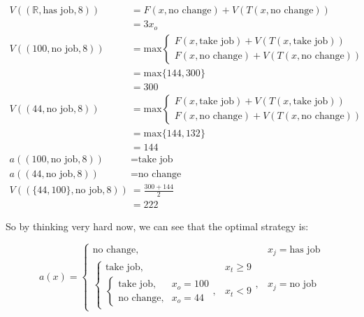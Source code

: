 \documentclass[a4paper, 12pt]{article}
\begin{document}
\[
\begin{aligned}
  V((\mathbb{R}, \text{has job}, 8)) &= F(x, \text{no change}) + V(T(x, \text{no change})) \\
                                &= 3x_{o} \\
  V((100, \text{no job}, 8)) &= \text{max} \begin{cases}
    F(x, \text{take job}) + V(T(x, \text{take job})) \\
    F(x, \text{no change}) + V(T(x, \text{no change}))
  \end{cases} \\
                             &= \text{max}\{144, 300\} \\
                             &= 300 \\
  V((44, \text{no job}, 8)) &= \text{max} \begin{cases}
    F(x, \text{take job}) + V(T(x, \text{take job})) \\
    F(x, \text{no change}) + V(T(x, \text{no change}))
  \end{cases} \\
                             &= \text{max}\{144, 132\} \\
                             &= 144 \\
    a((100, \text{no job}, 8)) &= \text{take job} \\
    a((44, \text{no job}, 8)) &= \text{no change} \\
    V((\{44, 100\}, \text{no job}, 8)) &= \frac{300+144}{2} \\
                                       &= 222
\end{aligned}
\]

So by thinking very hard now, we can see that the optimal strategy is:

\[
  a(x) = \begin{cases}
    \text{no change}, & x_{j} = \text{has job} \\
    \begin{cases}
      \text{take job}, & x_{t} \geq 9 \\
      \begin{cases}
        \text{take job}, & x_{o} = 100 \\
        \text{no change}, & x_{o} = 44
      \end{cases}, & x_{t} < 9
    \end{cases}, & x_{j} = \text{no job}
  \end{cases}
\]
\end{document}
